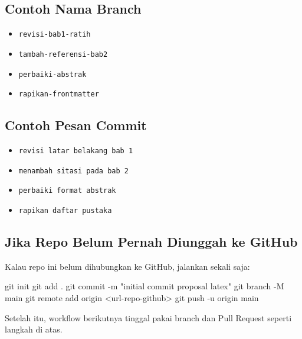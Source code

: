 \documentclass[
]{article}
\newenvironment{Shaded}{}{}
\newcommand{\AttributeTok}[1]{\textcolor[rgb]{0.49,0.56,0.16}{#1}}
\newcommand{\FunctionTok}[1]{\textcolor[rgb]{0.02,0.16,0.49}{#1}}
\newcommand{\NormalTok}[1]{#1}
\newcommand{\OperatorTok}[1]{\textcolor[rgb]{0.40,0.40,0.40}{#1}}
\newcommand{\StringTok}[1]{\textcolor[rgb]{0.25,0.44,0.63}{#1}}
\providecommand{\tightlist}{%
  \setlength{\itemsep}{0pt}\setlength{\parskip}{0pt}}
\begin{document}
\subsection{Contoh Nama Branch}\label{contoh-nama-branch}

\begin{itemize}
\tightlist
\item
  \texttt{revisi-bab1-ratih}
\item
  \texttt{tambah-referensi-bab2}
\item
  \texttt{perbaiki-abstrak}
\item
  \texttt{rapikan-frontmatter}
\end{itemize}

\subsection{Contoh Pesan Commit}\label{contoh-pesan-commit}

\begin{itemize}
\tightlist
\item
  \texttt{revisi\ latar\ belakang\ bab\ 1}
\item
  \texttt{menambah\ sitasi\ pada\ bab\ 2}
\item
  \texttt{perbaiki\ format\ abstrak}
\item
  \texttt{rapikan\ daftar\ pustaka}
\end{itemize}

\subsection{Jika Repo Belum Pernah Diunggah ke
GitHub}\label{jika-repo-belum-pernah-diunggah-ke-github}

Kalau repo ini belum dihubungkan ke GitHub, jalankan sekali saja:

\begin{Shaded}
\begin{Highlighting}[]
\FunctionTok{git}\NormalTok{ init}
\FunctionTok{git}\NormalTok{ add .}
\FunctionTok{git}\NormalTok{ commit }\AttributeTok{{-}m} \StringTok{"initial commit proposal latex"}
\FunctionTok{git}\NormalTok{ branch }\AttributeTok{{-}M}\NormalTok{ main}
\FunctionTok{git}\NormalTok{ remote add origin }\OperatorTok{\textless{}}\NormalTok{url{-}repo{-}github}\OperatorTok{\textgreater{}}
\FunctionTok{git}\NormalTok{ push }\AttributeTok{{-}u}\NormalTok{ origin main}
\end{Highlighting}
\end{Shaded}

Setelah itu, workflow berikutnya tinggal pakai branch dan Pull Request
seperti langkah di atas.
\end{document}
